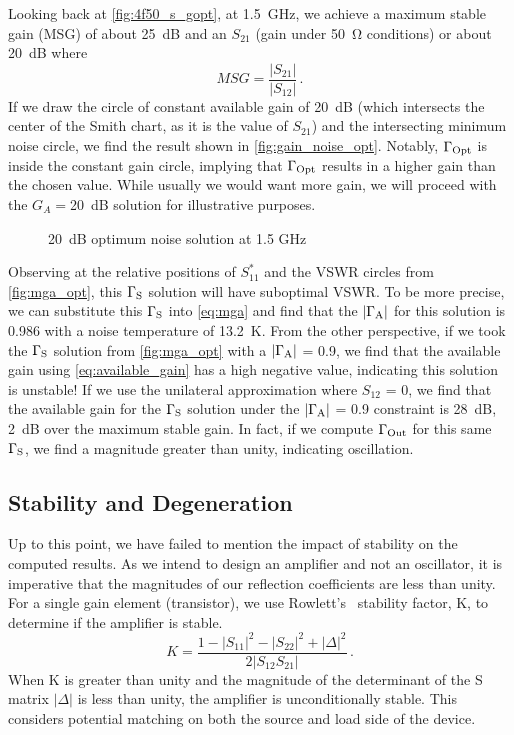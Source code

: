 Looking back at \autoref{fig:4f50_s_gopt}, at \qty{1.5}{\GHz}, we achieve a maximum stable gain (MSG) of about \qty{25}{\dB} and an $S_{21}$ (gain under \qty{50}{\ohm} conditions) or about \qty{20}{\dB} where
%
\begin{equation}
    MSG = \frac{|S_{21}|}{|S_{12}|}\,.
    \label{eq:msg}
\end{equation}
%
If we draw the circle of constant available gain of \qty{20}{\dB} (which intersects the center of the Smith chart, as it is the value of $S_{21}$) and the intersecting minimum noise circle, we find the result shown in \autoref{fig:gain_noise_opt}.
Notably, $\Gamma_{\text{Opt}}$ is inside the constant gain circle, implying that $\Gamma_{\text{Opt}}$ results in a higher gain than the chosen value.
While usually we would want more gain, we will proceed with the $G_A=$\qty{20}{dB} solution for illustrative purposes.

\begin{figure}[ht!]
    \centering
    
    \caption{\qty{20}{\dB} optimum noise solution at 1.5 GHz}
    \label{fig:gain_noise_opt}
\end{figure}

Observing at the relative positions of $S_{11}^*$ and the VSWR circles from \autoref{fig:mga_opt}, this $\Gamma_{\text{S}}$ solution will have suboptimal VSWR.
To be more precise, we can substitute this $\Gamma_{\text{S}}$ into \autoref{eq:mga} and find that the $|\Gamma_{\text{A}}|$ for this solution is \num{0.986} with a noise temperature of \qty{13.2}{\K}.
From the other perspective, if we took the $\Gamma_{\text{S}}$ solution from \autoref{fig:mga_opt} with a $|\Gamma_{\text{A}}|$ = 0.9, we find that the available gain using \autoref{eq:available_gain} has a high negative value, indicating this solution is unstable!
If we use the unilateral approximation where $S_{12}$ = 0, we find that the available gain for the $\Gamma_{\text{S}}$ solution under the $|\Gamma_{\text{A}}|$ = 0.9 constraint is \qty{28}{\dB}, \qty{2}{\dB} over the maximum stable gain.
In fact, if we compute $\Gamma_{\text{Out}}$ for this same $\Gamma_{\text{S}}$, we find a magnitude greater than unity, indicating oscillation.

\subsection{Stability and Degeneration}

Up to this point, we have failed to mention the impact of stability on the computed results.
As we intend to design an amplifier and not an oscillator, it is imperative that the magnitudes of our reflection coefficients are less than unity.
For a single gain element (transistor), we use Rowlett's~\cite{rollettStabilityPowerGainInvariants1962} stability factor, K, to determine if the amplifier is stable.
%
\begin{equation}
    K = \frac{1-|S_{11}|^2-|S_{22}|^2 + |\Delta|^2}{2|S_{12}S_{21}|}\,.
\end{equation}
%
When K is greater than unity and the magnitude of the determinant of the S matrix $|\Delta|$ is less than unity, the amplifier is unconditionally stable.
This considers potential matching on both the source and load side of the device.

